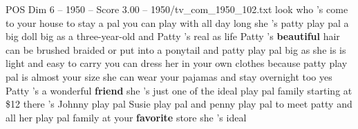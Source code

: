 \begin{textsample}{POS Dim 6 – 1950 – Score 3.00 – 1950/tv\_com\_1950\_102.txt}  \label{ex:f6_pos_004}
look who 's come to your house to stay a pal you can play with all day long she 's patty play pal a big doll big as a three-year-old and Patty 's real as life Patty 's \textbf{beautiful} hair can be brushed braided or put into a ponytail and patty play pal big as she is is light and easy to carry you can dress her in your own clothes because patty play pal is almost your size she can wear your pajamas and stay overnight too yes Patty 's a wonderful \textbf{friend} she 's just one of the ideal play pal family starting at \$12 there 's Johnny play pal Susie play pal and penny play pal to meet patty and all her play pal family at your \textbf{favorite} store she 's ideal

\end{textsample}

